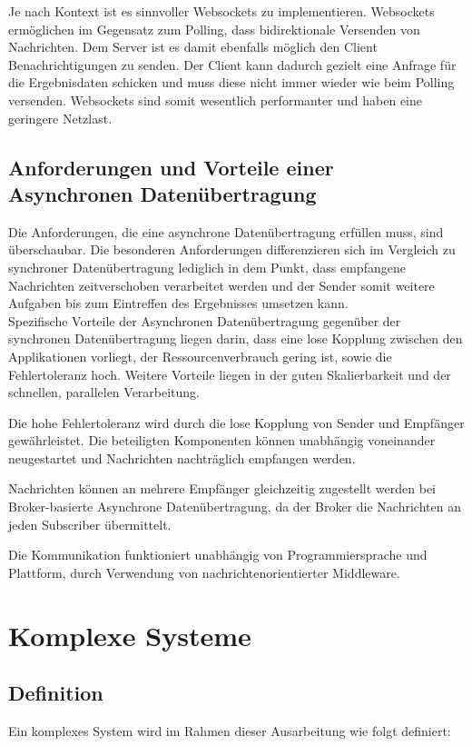 Je nach Kontext ist es sinnvoller Websockets zu implementieren. Websockets ermöglichen im Gegensatz zum Polling, dass bidirektionale Versenden von Nachrichten. Dem Server ist es damit ebenfalls möglich den Client Benachrichtigungen zu senden. Der Client kann dadurch gezielt eine Anfrage für die Ergebnisdaten schicken und muss diese nicht immer wieder wie beim Polling versenden. Websockets sind somit wesentlich performanter und haben eine geringere Netzlast. \cite*{goll:2020}

\subsection{Anforderungen und Vorteile einer Asynchronen Datenübertragung}
Die Anforderungen, die eine asynchrone Datenübertragung erfüllen muss, sind überschaubar. Die besonderen Anforderungen differenzieren sich im Vergleich zu synchroner Datenübertragung lediglich in dem Punkt, dass empfangene Nachrichten zeitverschoben verarbeitet werden \cite*{tremp:2021} und der Sender somit weitere Aufgaben bis zum Eintreffen des Ergebnisses umsetzen kann.  \\

Spezifische Vorteile der Asynchronen Datenübertragung gegenüber der synchronen Datenübertragung liegen darin, dass eine lose Kopplung zwischen den Applikationen vorliegt, der Ressourcenverbrauch gering ist, sowie die Fehlertoleranz hoch. \cite*{tremp:2021}
Weitere Vorteile liegen in der guten Skalierbarkeit und der schnellen, parallelen Verarbeitung. \cite*{tremp:2021}

Die hohe Fehlertoleranz wird durch die lose Kopplung von Sender und Empfänger gewährleistet. Die beteiligten Komponenten können unabhängig voneinander neugestartet und Nachrichten nachträglich empfangen werden. \cite*{abts:2019}

Nachrichten können an mehrere Empfänger gleichzeitig zugestellt werden bei Broker-basierte Asynchrone Datenübertragung, da der Broker die Nachrichten an jeden Subscriber übermittelt. \cite*{abts:2019}

Die Kommunikation funktioniert unabhängig von Programmiersprache und Plattform, durch Verwendung von nachrichtenorientierter Middleware. \cite{abts:2019} 

\section{Komplexe Systeme}

\subsection{Definition}
Ein komplexes System wird im Rahmen dieser Ausarbeitung wie folgt definiert:

